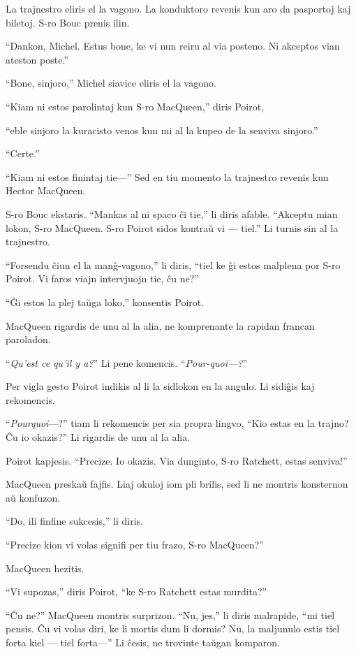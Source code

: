 La trajnestro eliris el la vagono. La konduktoro revenis kun aro da pasportoj kaj biletoj. S-ro Bouc prenis ilin.

``Dankon, Michel. Estus bone, ke vi nun reiru al via posteno. Ni akceptos vian ateston poste.''

``Bone, sinjoro,'' Michel siavice eliris el la vagono.

``Kiam ni estos parolintaj kun S-ro MacQueen,'' diris Poirot,

``eble sinjoro la kuracisto venos kun mi al la kupeo de la senviva sinjoro.''

``Certe.''

``Kiam ni estos finintaj tie---'' Sed en tiu momento la trajnestro revenis kun Hector MacQueen.

S-ro Bouc ekstaris. ``Mankas al ni spaco ĉi tie,'' li diris afable. ``Akceptu mian lokon, S-ro MacQueen. S-ro Poirot sidos kontraŭ vi --- tiel.'' Li turnis sin al la trajnestro.

``Forsendu ĉiun el la manĝ-vagono,'' li diris, ``tiel ke ĝi estos malplena por S-ro Poirot. Vi faros viajn intervjuojn tie, ĉu ne?''

``Ĝi estos la plej taŭga loko,'' konsentis Poirot.

MacQueen rigardis de unu al la alia, ne komprenante la rapidan francan paroladon.

``\emph{Qu'est ce qu'il y a?}'' Li pene komencis. ``\emph{Pour-quoi---?}''

Per vigla gesto Poirot indikis al li la sidlokon en la angulo. Li sidiĝis kaj rekomencis.

``\emph{Pourquoi}---?'' tiam li rekomencis per sia propra lingvo, ``Kio estas en la trajno? Ĉu io okazis?'' Li rigardis de unu al la alia.

Poirot kapjesis. ``Precize. Io okazis. Via dunginto, S-ro Ratchett, estas senviva!''

MacQueen preskaŭ fajfis. Liaj okuloj iom pli brilis, sed li ne montris konsternon aŭ konfuzon.

``Do, ili finfine sukcesis,'' li diris.

``Precize kion vi volas signifi per tiu frazo, S-ro MacQueen?''

MacQueen hezitis.

``Vi supozas,'' diris Poirot, ``ke S-ro Ratchett estas murdita?''

``Ĉu ne?'' MacQueen montris surprizon. ``Nu, jes,'' li diris malrapide, ``mi tiel pensis. Ĉu vi volas diri, ke li mortis dum li dormis? Nu, la maljunulo estis tiel forta kiel --- tiel forta---'' Li ĉesis, ne trovinte taŭgan komparon.


